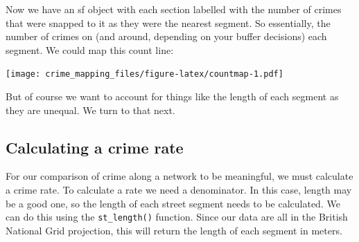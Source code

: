 \documentclass[
  krantz2]{krantz}
\makeatletter
\newenvironment{Shaded}{\begin{snugshade}}{\end{snugshade}}
\newcommand{\AttributeTok}[1]{\textcolor[rgb]{0.61,0.61,0.61}{#1}}
\newcommand{\CommentTok}[1]{\textcolor[rgb]{0.37,0.37,0.37}{\textit{#1}}}
\newcommand{\DecValTok}[1]{\textcolor[rgb]{0.06,0.06,0.06}{#1}}
\newcommand{\FunctionTok}[1]{\textcolor[rgb]{0,0,0}{#1}}
\newcommand{\NormalTok}[1]{#1}
\newcommand{\OtherTok}[1]{\textcolor[rgb]{0.37,0.37,0.37}{#1}}
\newcommand{\SpecialCharTok}[1]{\textcolor[rgb]{0,0,0}{#1}}
\newcommand{\StringTok}[1]{\textcolor[rgb]{0.5,0.5,0.5}{#1}}
\newenvironment{kframe}{%
\medskip{}
\setlength{\fboxsep}{.8em}
 \def\at@end@of@kframe{}%
 \ifinner\ifhmode%
  \def\at@end@of@kframe{\end{minipage}}%
  \begin{minipage}{\columnwidth}%
 \fi\fi%
 \def\FrameCommand##1{\hskip\@totalleftmargin \hskip-\fboxsep
 \colorbox{shadecolor}{##1}\hskip-\fboxsep
     \hskip-\linewidth \hskip-\@totalleftmargin \hskip\columnwidth}%
 \MakeFramed {\advance\hsize-\width
   \@totalleftmargin\z@ \linewidth\hsize
   \@setminipage}}%
 {\par\unskip\endMakeFramed%
 \at@end@of@kframe}
\renewenvironment{Shaded}{\begin{kframe}}{\end{kframe}}
\makeatother
\begin{document}
Now we have an sf object with each section labelled with the number of crimes that were snapped to it as they were the nearest segment. So essentially, the number of crimes on (and around, depending on your buffer decisions) each segment. We could map this count line:

\begin{Shaded}
\end{Shaded}

\texttt{[image: crime\_mapping\_files/figure-latex/countmap-1.pdf]}

But of course we want to account for things like the length of each segment as they are unequal. We turn to that next.

\hypertarget{calculating-a-crime-rate}{%
\subsection{Calculating a crime rate}\label{calculating-a-crime-rate}}

For our comparison of crime along a network to be meaningful, we must calculate a crime rate. To calculate a rate we need a denominator. In this case, length may be a good one, so the length of each street segment needs to be calculated. We can do this using the \texttt{st\_length()} function. Since our data are all in the British National Grid projection, this will return the length of each segment in meters.
\end{document}
